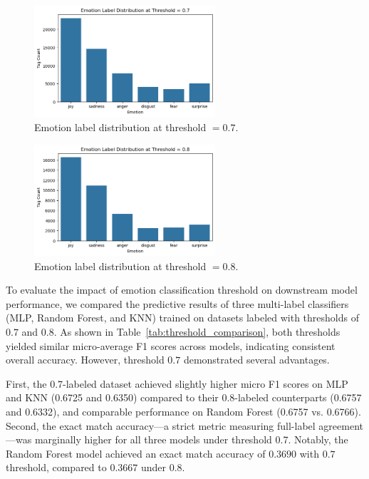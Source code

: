 \documentclass{article}
\begin{document}
\begin{figure}[h]
  \centering
  \includegraphics[width=0.6\textwidth]{Graphics/Appendix/0.7 Threshold.png}
  \caption{Emotion label distribution at threshold $=0.7$.}
  \label{fig:threshold_0.7}
\end{figure}

\begin{figure}[h]
  \centering
  \includegraphics[width=0.6\textwidth]{Graphics/Appendix/0.8 Threshold.png}
  \caption{Emotion label distribution at threshold $=0.8$.}
  \label{fig:threshold_0.8}
\end{figure}

To evaluate the impact of emotion classification threshold on downstream model performance, we compared the predictive results of three multi-label classifiers (MLP, Random Forest, and KNN) trained on datasets labeled with thresholds of $0.7$ and $0.8$. As shown in Table~\ref{tab:threshold_comparison}, both thresholds yielded similar micro-average F1 scores across models, indicating consistent overall accuracy. However, threshold $0.7$ demonstrated several advantages.

First, the 0.7-labeled dataset achieved slightly higher micro F1 scores on MLP and KNN (0.6725 and 0.6350) compared to their 0.8-labeled counterparts (0.6757 and 0.6332), and comparable performance on Random Forest (0.6757 vs. 0.6766). Second, the exact match accuracy—a strict metric measuring full-label agreement—was marginally higher for all three models under threshold 0.7. Notably, the Random Forest model achieved an exact match accuracy of $0.3690$ with $0.7$ threshold, compared to $0.3667$ under $0.8$.
\end{document}
